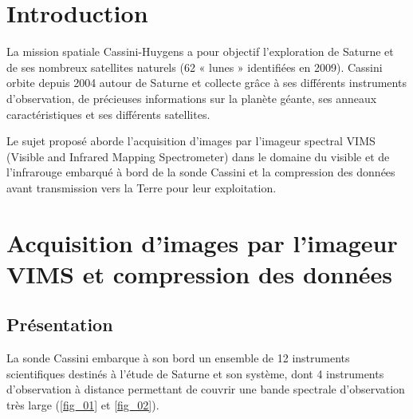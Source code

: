 \documentclass[10pt,fleqn]{article} %
\begin{document}
\section{Introduction}

\ifprof
\else
La mission spatiale Cassini-Huygens a pour objectif l'exploration de Saturne et de ses nombreux satellites naturels (62 « lunes » identifiées en 2009). Cassini orbite depuis 2004 autour de Saturne et collecte grâce à ses différents instruments d'observation, de précieuses informations sur la planète géante, ses anneaux caractéristiques
et ses différents satellites.

Le sujet proposé aborde l'acquisition d'images par l'imageur spectral VIMS (Visible and Infrared Mapping Spectrometer) dans le domaine du visible et de l'infrarouge embarqué à bord de la sonde Cassini et la compression des données avant transmission vers la Terre pour leur exploitation.
\fi
\section{Acquisition d'images par l'imageur VIMS et compression des données}
\subsection{Présentation}
\ifprof
\else
La sonde Cassini embarque à son bord un ensemble de 12 instruments scientifiques destinés à l'étude de Saturne et son système, dont 4 instruments d'observation à distance permettant de couvrir une bande spectrale d'observation très large 
(\autoref{fig_01} et \autoref{fig_02}).
\end{document}
